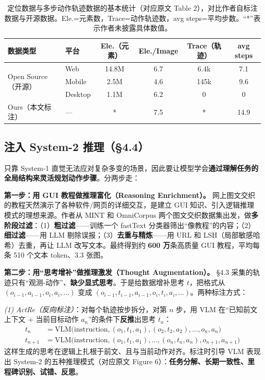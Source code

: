 \documentclass[11pt,UTF8,fontset=fandol]{ctexart}
\begin{document}
\begin{table}[H]\centering
\caption{定位数据与多步动作轨迹数据的基本统计（对应原文 Table 2），对比作者自标注数据与开源数据。Ele.=元素数，Trace=动作轨迹数，avg steps=平均步数。“*”表示作者未披露具体数值。}
\label{tab:data}
\small
\begin{tabular}{llcccc}
\toprule
数据类型 & 平台 & Ele.（元素） & Ele./Image & Trace（轨迹） & avg steps \\
\midrule
\multirow{3}{*}{Open Source（开源）}
 & Web    & 14.8M & 6.7 & 6.4k & 7.1 \\
 & Mobile & 2.5M  & 4.6 & 145k & 9.6 \\
 & Desktop& 1.1M  & 6.2 & 0    & 0 \\
\midrule
Ours（本文标注） & --- & * & 7.5 & * & 14.9 \\
\bottomrule
\end{tabular}
\end{table}

\subsection{注入 System-2 推理（§4.4）}

只靠 System-1 直觉无法应对复杂多变的场景，因此要让模型学会\textbf{通过理解任务的全局结构来灵活规划动作步骤}。分两步走：

\textbf{第一步：用 GUI 教程做推理富化（Reasoning Enrichment）。} 网上图文交织的教程天然演示了各种软件/网页的详细交互，是建立 GUI 知识、引入逻辑推理模式的理想来源。作者从 MINT 和 OmniCorpus 两个图文交织数据集出发，做\textbf{多阶段过滤}：（1）\textbf{粗过滤}——训练一个 fastText 分类器筛出“像教程”的内容；（2）\textbf{细过滤}——用 LLM 剔除误报；（3）\textbf{去重与精炼}——用 URL 和 LSH（局部敏感哈希）去重，再让 LLM 改写文本。最终得到约 \textbf{600 万}条高质量 GUI 教程，平均每条 510 个文本 token、3.3 张图。

\textbf{第二步：用“思考增补”做推理激发（Thought Augmentation）。} §4.3 采集的轨迹只有“观测-动作”、\textbf{缺少显式思考}。于是给数据增补思考 $t$，把格式从 $(o_{i-1},a_{i-1},o_i,a_i,\dots)$ 变成 $(o_{i-1},t_{i-1},a_{i-1},o_i,t_i,a_i,\dots)$。两种标注方式：

\emph{(1) ActRe（反向标注）}：对每个轨迹按步拆分，对第 $n$ 步，用 VLM 在“已知前文上下文 + 当前目标动作 $a_n$”的条件下\textbf{反推}出思考 $t_n$：
\[
\begin{aligned}
t_n &= \mathrm{VLM}\big(\text{instruction},(o_1,t_1,a_1),(o_2,t_2,a_2),\dots,o_n,a_n\big)\\
t_{n+1} &= \mathrm{VLM}\big(\text{instruction},(o_1,t_1,a_1),\dots,(o_n,t_n,a_n),o_{n+1},a_{n+1}\big)
\end{aligned}
\]
这样生成的思考在逻辑上扎根于前文、且与当前动作对齐。标注时引导 VLM 表现出 System-2 的五种推理模式（对应原文 Figure 6）：\textbf{任务分解、长期一致性、里程碑识别、试错、反思}。
\end{document}
